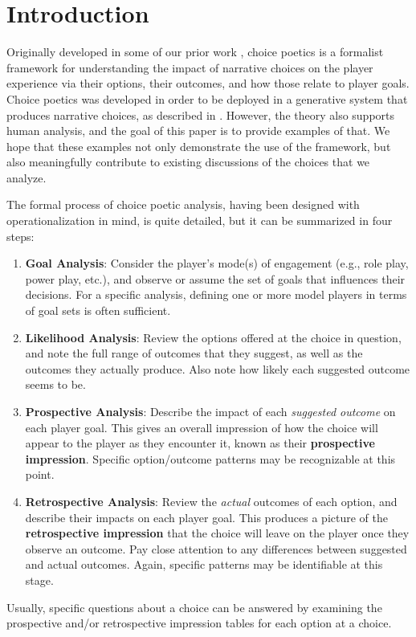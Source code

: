 \documentclass[arts,article,submit,moreauthors,pdftex,10pt,a4paper]{Definitions/mdpi}
\begin{document}
\maketitle

\section{Introduction}

Originally developed in some of our prior work \citep{mawhorter2014towards,mawhorter2015intentionally,mawhorter2015generating,mawhorter2016artificial}, choice poetics is a formalist framework for understanding the impact of narrative choices on the player experience via their options, their outcomes, and how those relate to player goals.
%
Choice poetics was developed in order to be deployed in a generative system that produces narrative choices, as described in \citep{mawhorter2015generating,mawhorter2016artificial}.
%
However, the theory also supports human analysis, and the goal of this paper is to provide examples of that.
%
We hope that these examples not only demonstrate the use of the framework, but also meaningfully contribute to existing discussions of the choices that we analyze.


\label{sec:analysis_steps}
The formal process of choice poetic analysis, having been designed with operationalization in mind, is quite detailed, but it can be summarized in four steps:
\begin{enumerate}
  \item \textbf{Goal Analysis}: Consider the player's mode(s) of engagement (e.g., role play, power play, etc.), and observe or assume the set of goals that influences their decisions. For a specific analysis, defining one or more model players in terms of goal sets is often sufficient.
  \item \textbf{Likelihood Analysis}: Review the options offered at the choice in question, and note the full range of outcomes that they suggest, as well as the outcomes they actually produce. Also note how likely each suggested outcome seems to be.
  \item \textbf{Prospective Analysis}: Describe the impact of each \emph{suggested outcome} on each player goal. This gives an overall impression of how the choice will appear to the player as they encounter it, known as their \textbf{prospective impression}. Specific option/outcome patterns may be recognizable at this point.
  \item \textbf{Retrospective Analysis}: Review the \emph{actual} outcomes of each option, and describe their impacts on each player goal. This produces a picture of the \textbf{retrospective impression} that the choice will leave on the player once they observe an outcome. Pay close attention to any differences between suggested and actual outcomes. Again, specific patterns may be identifiable at this stage.
\end{enumerate}
Usually, specific questions about a choice can be answered by examining the prospective and/or retrospective impression tables for each option at a choice.
\end{document}
